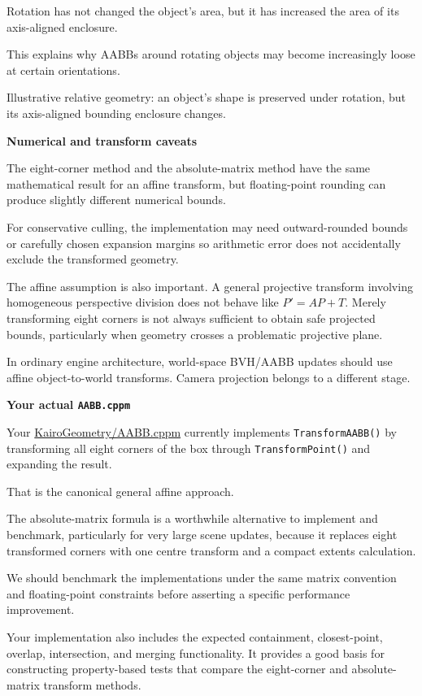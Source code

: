 Rotation has not changed the object's area, but it has increased the area of its axis-aligned enclosure.

This explains why AABBs around rotating objects may become increasingly loose at certain orientations.

Illustrative relative geometry: an object's shape is preserved under rotation, but its axis-aligned bounding enclosure changes.

\textbf{Numerical and transform caveats}

The eight-corner method and the absolute-matrix method have the same mathematical result for an affine transform, but floating-point rounding can produce slightly different numerical bounds.

For conservative culling, the implementation may need outward-rounded bounds or carefully chosen expansion margins so arithmetic error does not accidentally exclude the transformed geometry.

The affine assumption is also important. A general projective transform involving homogeneous perspective division does not behave like \(P'=AP+T\). Merely transforming eight corners is not always sufficient to obtain safe projected bounds, particularly when geometry crosses a problematic projective plane.

In ordinary engine architecture, world-space BVH/AABB updates should use affine object-to-world transforms. Camera projection belongs to a different stage.

\textbf{Your actual \texttt{AABB.cppm}}

Your \href{https://github.com/swayam8624/KairoGeometry/blob/master/AABB.cppm?utm_source=chatgpt.com}{KairoGeometry/AABB.cppm} currently implements \texttt{TransformAABB()} by transforming all eight corners of the box through \texttt{TransformPoint()} and expanding the result.

That is the canonical general affine approach.

The absolute-matrix formula is a worthwhile alternative to implement and benchmark, particularly for very large scene updates, because it replaces eight transformed corners with one centre transform and a compact extents calculation.

We should benchmark the implementations under the same matrix convention and floating-point constraints before asserting a specific performance improvement.

Your implementation also includes the expected containment, closest-point, overlap, intersection, and merging functionality. It provides a good basis for constructing property-based tests that compare the eight-corner and absolute-matrix transform methods.

